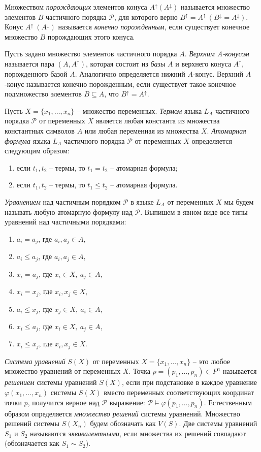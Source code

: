 \documentclass[12pt]{article}
\theoremstyle{break}
\def\P{\mathcal{P}}
\begin{document}
		Множеством \textit{порождающих} элементов конуса $A^{\uparrow}(A^{\downarrow})$ называется множество элементов $B$ частичного порядка $\P$, для которого верно $B^{\uparrow}=A^{\uparrow}~(B^{\downarrow}=A^{\downarrow})$. Конус $A^{\uparrow}~(A^{\downarrow})$ называется \textit{конечно порожденным}, если существует конечное множество $B$ порождающих этого конуса.

		Пусть задано множество элементов частичного порядка $A$. \textit{Верхним A-конусом} называется пара $(A, A^{\uparrow})$, которая состоит из \textit{базы} $A$ и верхнего конуса $A^{\uparrow}$, порожденного базой $A$. Аналогично определяется нижний $A$-конус. Верхний $A$-конус называется конечно порожденным, если существует такое конечное подмножество элементов $B\subseteq A$, что $B^{\uparrow} = A^{\uparrow}$.

		Пусть $X = \{x_1,\dots,x_n\}$ -- множество переменных. \textit{Термом} языка $L_A$ частичного порядка $\P$ от переменных $X$ является любая константа из множества константных символов $A$ или любая переменная из множества $X$. \textit{Атомарная формула} языка $L_A$ частичного порядка $\P$ от переменных $X$ определяется следующим образом:
		\begin{enumerate}
			\item если $t_1, t_2$ -- термы, то $t_1=t_2$ -- атомарная формула;
			\item если $t_1, t_2$ -- термы, то $t_1\leqslant t_2$ -- атомарная формула.
		\end{enumerate}

		\textit{Уравнением} над частичным порядком $\P$ в языке $L_A$ от переменных $X$ мы будем называть любую атомарную формулу над $\P$. Выпишем в явном виде все типы уравнений над частичными порядками:
		\begin{enumerate}
			\item $a_i=a_j$, где $a_i, a_j\in A$,
			\item $a_i\leqslant a_j$, где $a_i, a_j\in A$,
			\item $x_i=a_j$, где $x_i\in X,~a_j\in A$,
			\item $x_i=x_j$, где $x_i, x_j\in X$,
			\item $a_i\leqslant x_j$, где $x_j\in X,~a_i\in A$,
			\item $x_i\leqslant a_j$, где $x_i\in X,~a_j\in A$,
			\item $x_i\leqslant x_j$, где $x_i, x_j\in X$.
		\end{enumerate}

		\textit{Система уравнений} $S(X)$ от переменных $X=\{x_1,\dots,x_n\}$ -- это любое множество уравнений от переменных $X$. Точка $p=(p_1,\dots,p_n)\in P^n$ называется \textit{решением} системы уравнений $S(X)$, если при подстановке в каждое уравнение $\varphi(x_1,\dots,x_n)$ системы $S(X)$ вместо переменных соответствующих координат точки $p$, получится верное над $\P$ выражение: $\P\vDash \varphi(p_1,\dots,p_n)$. Естественным образом определяется \textit{множество решений} системы уравнений. Множество решений системы $S(X_n)$ будем обозначать как $V(S)$. Две системы уравнений $S_1$ и $S_2$ называются \textit{эквивалентными}, если множества их решений совпадают (обозначается как $S_1\sim S_2$).
\end{document}
